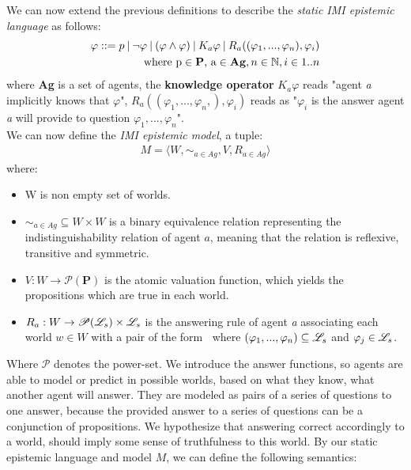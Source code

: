 We can now extend the previous definitions to describe the \textit{static IMI
	epistemic language} \staticlang\: as follows:
\begin{align}
	\begin{split}
		\varphi ::= p \:|\:\neg\varphi\:|\:(\varphi \land \varphi) \:|\: K_a\varphi \:|\: R_a((\varphi_1,...,\varphi_n), \varphi_i) \\ \text{where p} \in \text{\textbf{P}}\text{, a} \in \text{\textbf{Ag}}, n \in \mathbb{N}, i \in 1..n \label{eq:2}
	\end{split}
\end{align}
where \textbf{Ag} is a set of agents, the \textbf{knowledge operator} $K_a\varphi$ reads "agent \textit{a} implicitly knows that $\varphi$",  $R_a((\varphi_1,...,\varphi_n,), \varphi_i)$ reads as "$\varphi_i$ is the answer agent \textit{a} will provide to question $\varphi_1,...,\varphi_n$". \\

We can now define the \textit{IMI epistemic model}, a tuple:
\begin{align}
	M = \langle W, \sim_{a\in Ag}, V, R_{a\in Ag}\rangle \label{eq:3}
\end{align}
where:
\begin{itemize}
	\setlength\itemsep{-0.4em}
	\item W is non empty set of worlds.
	\item $\sim_{a\in Ag} \subseteq W \times W$ is a binary equivalence relation representing the indistinguishability relation of agent $a$, meaning that the relation is reflexive, transitive and symmetric.
	\item $V : W \rightarrow \mathscr{P}(\mathbf{P})$ is the atomic valuation function, which yields the propositions which are true in each world. 
	\item $R_a : W \rightarrow \mathscr{P}(\mathscr{L}_s) \times \mathscr{L}_s$ is the answering rule of agent \textit{a} associating each world $w \in W$ with a pair of the form \aset $\:$ where $(\varphi_1,...,\varphi_n) \subseteq \mathscr{L}_s$ and $\varphi_j \in \mathscr{L}_s$.
\end{itemize}
Where $\mathscr{P}$ denotes the power-set. We introduce the answer functions, so agents are able to model or predict in possible worlds, based on what they know, what another agent will answer. They are modeled as pairs of a series of questions to one answer, because the provided answer to a series of questions can be a conjunction of propositions. We hypothesize that answering correct accordingly to a world, should imply some sense of truthfulness to this world. By our static epistemic language \staticlang\: and model $M$, we can define the following semantics:


